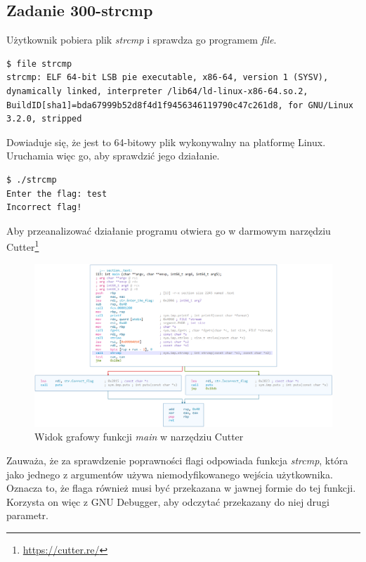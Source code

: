 \documentclass[polish,12pt]{aghthesis}
\begin{document}
\subsection{Zadanie 300-strcmp}

Użytkownik pobiera plik \emph{strcmp} i sprawdza go programem \emph{file}.

\begin{verbatim}
$ file strcmp
strcmp: ELF 64-bit LSB pie executable, x86-64, version 1 (SYSV), dynamically linked, interpreter /lib64/ld-linux-x86-64.so.2, BuildID[sha1]=bda67999b52d8f4d1f9456346119790c47c261d8, for GNU/Linux 3.2.0, stripped
\end{verbatim}

Dowiaduje się, że jest to 64-bitowy plik wykonywalny na platformę Linux.
Uruchamia więc go, aby sprawdzić jego działanie.

\begin{verbatim}
$ ./strcmp
Enter the flag: test
Incorrect flag!
\end{verbatim}

Aby przeanalizować działanie programu otwiera go w darmowym narzędziu Cutter\footnote{\url{https://cutter.re/}}

\begin{figure}[H]
    \centering
    \includegraphics[width=16cm]{300_cutter}
    \caption{Widok grafowy funkcji \emph{main} w narzędziu Cutter}
    \label{fig:300_cutter}
\end{figure}

Zauważa, że za sprawdzenie poprawności flagi odpowiada funkcja \emph{strcmp}, która
jako jednego z argumentów używa niemodyfikowanego wejścia użytkownika.
Oznacza to, że flaga również musi być przekazana w jawnej formie do tej funkcji.
Korzysta on więc z GNU Debugger, aby odczytać przekazany do niej drugi parametr.
\end{document}
